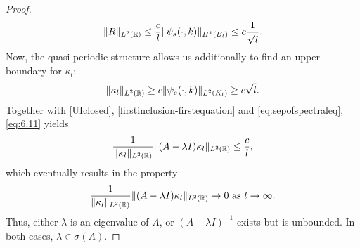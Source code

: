 \begin{theorem}
\begin{proof}
		\begin{equation}
			 \| R \|_{L^{2}(\mathbb{R})} \leq \frac{c}{l} \| \psi_{s}(\cdot, k) \|_{H^{1}(B_{l})} \leq c \frac{1}{\sqrt{l}}. \label{eq:estimofR}
		\end{equation}
		Now, the quasi-periodic structure allows us additionally to find an upper boundary for $\kappa_{l}$:
		\begin{equation}
			\| \kappa_{l} \|_{L^{2}(\mathbb{R})} \geq c \| \psi_{s}(\cdot, k) \|_{L^{2}(K_{l})} \geq c \sqrt{l}. \label{eq:6.11}
		\end{equation} 
		Together with \eqref{UIclosed}, \eqref{firstinclusion-firstequation} and \eqref{eq:sepofspectraleq}, \eqref{eq:6.11} yields
		\[ \frac{1}{\|\kappa_{l}\|_{L^{2}(\mathbb{R})}}\| (A - \lambda I) \kappa_{l} \|_{L^{2}(\mathbb{R})} \leq \frac{c}{l}, \]
		which eventually results in the property
			\[ \frac{1}{\|\kappa_{l} \|_{L^{2}(\mathbb{R})}} \| (A - \lambda I) \kappa_{l} \|_{L^{2}(\mathbb{R})} \rightarrow 0 \text{ as } l \rightarrow \infty. \]
		Thus, either $\lambda$ is an eigenvalue of $A$, or $(A - \lambda I)^{-1}$ exists but is unbounded. In both cases, $\lambda \in \sigma(A)$.
	\end{proof}
\end{theorem}	
		
